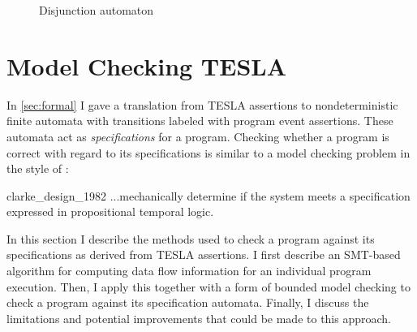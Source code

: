 \begin{figure}
  \centering
  \caption{Disjunction automaton}
  \label{fig:disj-auto}
\end{figure}

\section{Model Checking TESLA} \label{sec:checking}

In \autoref{sec:formal} I gave a translation from TESLA assertions to
nondeterministic finite automata with transitions labeled with program
event assertions. These automata act as \emph{specifications} for a
program. Checking whether a program is correct with regard to its
specifications is similar to a model checking problem in the style of
\textcite{clarke_design_1982}:

\begin{displaycquote}[p. 2]{clarke_design_1982}
  ...mechanically determine if the system meets a specification expressed in
  propositional temporal logic.
\end{displaycquote}

In this section I describe the methods used to check a program against
its specifications as derived from TESLA assertions. I first describe an
SMT-based algorithm for computing data flow information for an
individual program execution. Then, I apply this together with a form of
bounded model checking to check a program against its specification
automata. Finally, I discuss the limitations and potential improvements
that could be made to this approach.

